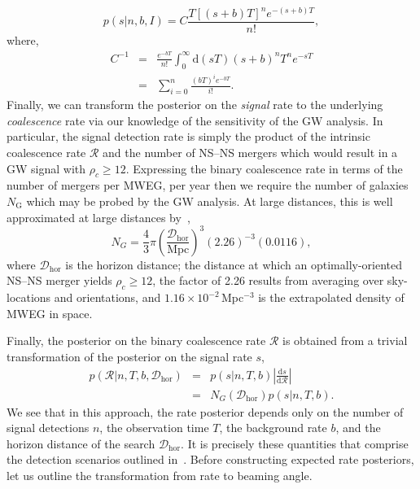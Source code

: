 \documentclass[twocolumn,nofootinbib]{revtex4-1}
\newcommand{\cbcrate}{{{\mathcal R}}}
\newcommand{\diff}{{\mathrm d}}
\newcommand{\dhor}{{\mathcal D}_{\mathrm{hor}}}
\newcommand{\BNS}{\ac{NS}--\ac{NS}\xspace}
\begin{document}
%
\begin{equation}
p(s|n,b,I) = C \frac{ T\left[(s+b)T\right]^n e^{-(s+b)T}}{n!},
\end{equation}
%
where,
\begin{eqnarray}
C^{-1} & = &\frac{e^{-bT}}{n!} \int_0^{\infty}\diff(sT)(s+b)^n T^n e^{-sT}\\
& = & \sum_{i=0}^n \frac{ (bT)^i e^{-bT}}{i!}.
\end{eqnarray}
%
Finally, we can transform the posterior on the \emph{signal} rate to the underlying \emph{coalescence} rate via our knowledge of the sensitivity of the \ac{GW} analysis.
In particular, the signal detection rate is simply the product of the intrinsic coalescence rate $\cbcrate$ and the number of \BNS mergers which would result in a \ac{GW} signal with $\rho_c\geq12$.
Expressing the binary coalescence rate in terms of the number of mergers per \ac{MWEG}, per year then we require the number of galaxies $N_{\mathrm{G}}$ which may be probed by the \ac{GW} analysis.
At large distances, this is well approximated at large distances by~\cite{rates_paper},
%
\begin{equation}
    N_G = \frac{4}{3} \pi \left( \frac{\dhor}{\textrm{Mpc}}
\right)^3 (2.26)^{-3} (0.0116),
\end{equation}
%
where $\dhor$ is the horizon distance; the distance at which an optimally-oriented \BNS merger yields $\rho_c\geq12$, the factor of 2.26 results from averaging over sky-locations and orientations, and $1.16\times 10^{-2}$\,Mpc$^{-3}$ is the extrapolated density of \ac{MWEG} in space.

Finally, the posterior on the binary coalescence rate $\cbcrate$ is obtained from a trivial transformation of the posterior on the signal rate $s$,
%
\begin{eqnarray}
    p(\cbcrate|n,T,b,\dhor) & = & p(s|n,T,b) \left|\frac{\diff s}{\diff \cbcrate}\right| \\
                                   & = & N_G(\dhor)p(s|n,T,b).
\end{eqnarray}
%
We see that in this approach, the rate posterior depends only on the number of signal detections $n$, the observation time $T$, the background rate $b$, and the horizon distance of the search $\dhor$.
It is precisely these quantities that comprise the detection scenarios outlined in~\cite{ade_prospects}.
Before constructing expected rate posteriors, let us outline the transformation from rate to beaming angle.
\end{document}
